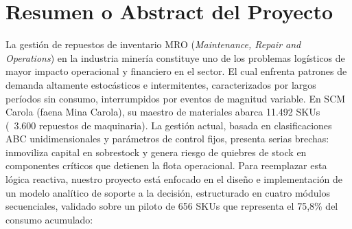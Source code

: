 \documentclass[10pt,a4paper]{article}
\begin{document}
\section*{Resumen o Abstract del Proyecto}
\label{sec:Resumen o Abstract del Proyecto}

La gestión de repuestos de inventario MRO (\textit{Maintenance, Repair and Operations}) en la industria minería constituye uno de los problemas logísticos de mayor impacto operacional y financiero en el sector. El cual enfrenta patrones de demanda altamente estocásticos e intermitentes, caracterizados por largos períodos sin consumo, interrumpidos por eventos de magnitud variable. En SCM Carola (faena Mina Carola), su maestro de materiales abarca 11.492 SKUs (~3.600 repuestos de maquinaria). La gestión actual, basada en clasificaciones ABC unidimensionales y parámetros de control fijos, presenta serias brechas: inmoviliza capital en sobrestock y genera riesgo de quiebres de stock en componentes críticos que detienen la flota operacional. 
Para reemplazar esta lógica reactiva, nuestro proyecto está enfocado en el diseño e implementación de un modelo analítico de soporte a la decisión, estructurado en cuatro módulos secuenciales, validado sobre un piloto de 656 SKUs que representa el 75,8\% del consumo acumulado:
\end{document}
